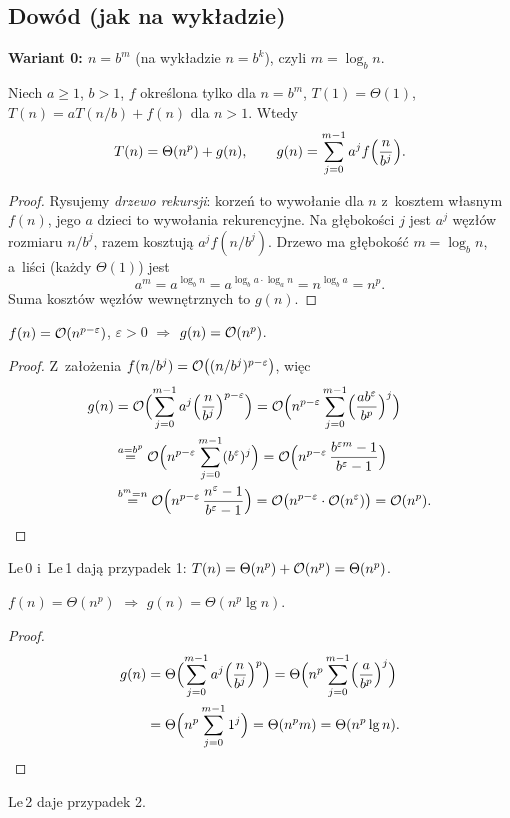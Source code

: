 \documentclass[11pt]{article}
\begin{document}
\subsection*{Dowód (jak na wykładzie)}

\textbf{Wariant 0: $n=b^m$} (na wykładzie $n=b^k$), czyli $m=\log_bn$.

\begin{lemat}\label{lem:le0}
Niech $a\ge1$, $b>1$, $f$ określona tylko dla $n=b^m$,
$T(1)=\Theta(1)$, $T(n)=aT(n/b)+f(n)$ dla $n>1$. Wtedy
\[
T(n)=\Theta(n^p)+g(n),\qquad g(n)=\sum_{j=0}^{m-1}a^jf\Bigl(\frac n{b^j}\Bigr).
\]
\end{lemat}
\begin{proof}
Rysujemy \emph{drzewo rekursji}: korzeń to wywołanie dla $n$ z~kosztem
własnym $f(n)$, jego $a$ dzieci to wywołania rekurencyjne. Na głębokości $j$
jest $a^j$ węzłów rozmiaru $n/b^j$, razem kosztują $a^jf(n/b^j)$. Drzewo
ma głębokość $m=\log_bn$, a~liści (każdy $\Theta(1)$) jest
\[
a^m=a^{\log_bn}=a^{\log_ba\cdot\log_an}=n^{\log_ba}=n^p.
\]
Suma kosztów węzłów wewnętrznych to $g(n)$.
\end{proof}

\begin{lemat}[Le\,1]\label{lem:le1}
$f(n)=\O(n^{p-\varepsilon})$, $\varepsilon>0$ $\Longrightarrow$ $g(n)=\O(n^p)$.
\end{lemat}
\begin{proof}
Z~założenia $f(n/b^j)=\O\bigl((n/b^j)^{p-\varepsilon}\bigr)$, więc
\begin{align*}
g(n)&=\O\Bigl(\sum_{j=0}^{m-1}a^j\Bigl(\frac n{b^j}\Bigr)^{p-\varepsilon}\Bigr)
=\O\Bigl(n^{p-\varepsilon}\sum_{j=0}^{m-1}\Bigl(\frac{ab^\varepsilon}{b^p}\Bigr)^j\Bigr)\\
&\overset{a=b^p}{=}\O\Bigl(n^{p-\varepsilon}\sum_{j=0}^{m-1}(b^\varepsilon)^j\Bigr)
=\O\Bigl(n^{p-\varepsilon}\,\frac{b^{\varepsilon m}-1}{b^\varepsilon-1}\Bigr)\\
&\overset{b^m=n}{=}\O\Bigl(n^{p-\varepsilon}\,\frac{n^{\varepsilon}-1}{b^\varepsilon-1}\Bigr)
=\O\bigl(n^{p-\varepsilon}\cdot\O(n^\varepsilon)\bigr)=\O(n^p).\qedhere
\end{align*}
\end{proof}
Le\,0 i~Le\,1 dają przypadek 1: $T(n)=\Theta(n^p)+\O(n^p)=\Theta(n^p)$.

\begin{lemat}[Le\,2]\label{lem:le2}
$f(n)=\Theta(n^p)$ $\Longrightarrow$ $g(n)=\Theta(n^p\lg n)$.
\end{lemat}
\begin{proof}
\begin{align*}
g(n)&=\Theta\Bigl(\sum_{j=0}^{m-1}a^j\Bigl(\frac n{b^j}\Bigr)^p\Bigr)
=\Theta\Bigl(n^p\sum_{j=0}^{m-1}\Bigl(\frac a{b^p}\Bigr)^j\Bigr)\\
&=\Theta\Bigl(n^p\sum_{j=0}^{m-1}1^j\Bigr)=\Theta(n^pm)=\Theta(n^p\lg n).\qedhere
\end{align*}
\end{proof}
Le\,2 daje przypadek 2.
\end{document}
